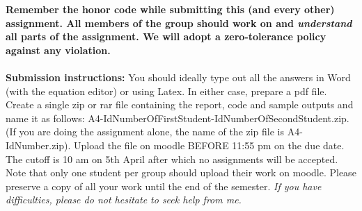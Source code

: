 \documentclass[11pt]{article}
\begin{document}
\maketitle

\textbf{Remember the honor code while submitting this (and every other) assignment. All members of the group should work on and \emph{understand} all parts of the assignment. We will adopt a \textbf{zero-tolerance policy} against any violation.}
\\
\\
\noindent\textbf{Submission instructions:} You should ideally type out all the answers in Word (with the equation editor) or using Latex. In either case, prepare a pdf file. Create a single zip or rar file containing the report, code and sample outputs and name it as follows: A4-IdNumberOfFirstStudent-IdNumberOfSecondStudent.zip. (If you are doing the assignment alone, the name of the zip file is A4-IdNumber.zip). Upload the file on moodle BEFORE 11:55 pm on the due date. The cutoff is 10 am on 5th April after which no assignments will be accepted. Note that only one student per group should upload their work on moodle. Please preserve a copy of all your work until the end of the semester. \emph{If you have difficulties, please do not hesitate to seek help from me.} 
\end{document}
